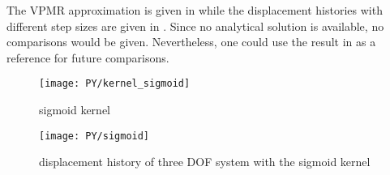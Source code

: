 The VPMR approximation  is given in  while the displacement histories with different step sizes are given in . Since no analytical solution is available, no comparisons would be given. Nevertheless, one could use the result in  as a reference for future comparisons.
\begin{figure}[H]
\centering
\texttt{[image: PY/kernel\_sigmoid]}
\caption{sigmoid kernel}\label{fig:sigmoid_kernel}
\end{figure}
\begin{figure}[H]
\centering
\texttt{[image: PY/sigmoid]}
\caption{displacement history of three DOF system with the sigmoid kernel}\label{fig:three_sigmoid}
\end{figure}
